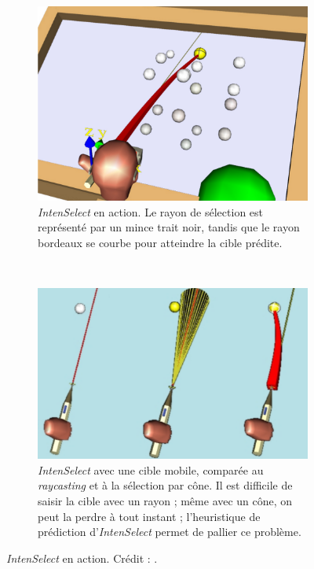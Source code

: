 	\begin{figure}[!htb]
		\begin{subfigure}[t]{0.44\textwidth}
			\centering
			\includegraphics[width=\textwidth]{figures/ch2/intenSnap}
			\caption{\emph{IntenSelect} en action. Le rayon de sélection est représenté par un mince trait noir, tandis que le rayon bordeaux se courbe pour atteindre la cible prédite.}
			\label{fig:intenSnap}
		\end{subfigure}
		~
		\begin{subfigure}[t]{0.54\textwidth}
			\centering
			\includegraphics[width=\textwidth]{figures/ch2/intenSnap2}
			\caption{\emph{IntenSelect} avec une cible mobile, comparée au \emph{raycasting} et à la sélection par cône. Il est difficile de saisir la cible avec un rayon ; même avec un cône, on peut la \og perdre \fg{} à tout instant ; l'heuristique de prédiction d'\emph{IntenSelect} permet de pallier ce problème.}
			\label{fig:intenSnap2}
		\end{subfigure}
		\caption[\emph{IntenSelect}]{\emph{IntenSelect} en action. Crédit : \cite{de2005intenselect}.}
		\label{fig:intenSnap12}
	\end{figure}
	
